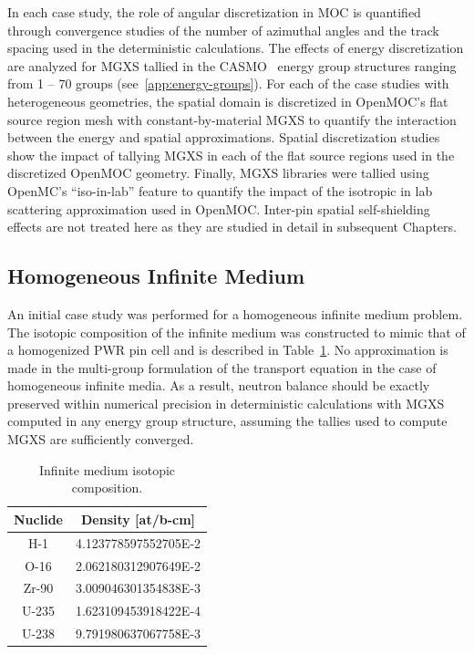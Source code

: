 In each case study, the role of angular discretization in \ac{MOC} is quantified through convergence studies of the number of azimuthal angles and the track spacing used in the deterministic calculations. The effects of energy discretization are analyzed for \ac{MGXS} tallied in the CASMO~\cite{rhodes2006casmo} energy group structures ranging from 1 -- 70 groups (see~\ref{app:energy-groups}). For each of the case studies with heterogeneous geometries, the spatial domain is discretized in OpenMOC's flat source region mesh with constant-by-material \ac{MGXS} to quantify the interaction between the energy and spatial approximations. Spatial discretization studies show the impact of tallying \ac{MGXS} in each of the flat source regions used in the discretized OpenMOC geometry. Finally, \ac{MGXS} libraries were tallied using OpenMC's ``iso-in-lab'' feature to quantify the impact of the isotropic in lab scattering approximation used in OpenMOC. Inter-pin spatial self-shielding effects are not treated here as they are studied in detail in subsequent Chapters.

\subsection{Homogeneous Infinite Medium}
\label{subsec:chap4-inf-medium}

An initial case study was performed for a homogeneous infinite medium problem. The isotopic composition of the infinite medium was constructed to mimic that of a homogenized \ac{PWR} pin cell and is described in Table~\ref{table:chap2-inf-med-isotopes}. No approximation is made in the multi-group formulation of the transport equation in the case of homogeneous infinite media. As a result, neutron balance should be exactly preserved within numerical precision in deterministic calculations with \ac{MGXS} computed in any energy group structure, assuming the tallies used to compute \ac{MGXS} are sufficiently converged.

\begin{table}[h!]
  \centering
  \caption{Infinite medium isotopic composition.}
  \label{table:chap2-inf-med-isotopes} 
  \vspace{14pt}
  \begin{tabular}{c c}
  \toprule
  \multicolumn{1}{c}{\bf Nuclide} &
  \multicolumn{1}{c}{\bf Density [at/b-cm]} \\
  \midrule
  H-1 &   4.123778597552705E-2 \\
  O-16 &  2.062180312907649E-2 \\
  Zr-90 & 3.009046301354838E-3 \\
  U-235 & 1.623109453918422E-4 \\
  U-238 & 9.791980637067758E-3 \\
  \bottomrule
\end{tabular}
\end{table}


